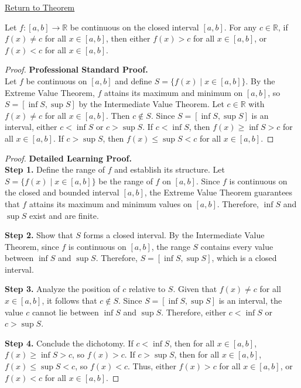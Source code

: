 \newpage
{}
\label{prf:darboux-property}

\begin{remark*}[Return]
\hyperref[thm:darboux-property]{Return to Theorem}
\end{remark*}

\begin{theorem*}
Let $f : [a, b] \to \mathbb{R}$ be continuous on the closed interval $[a, b]$. For any $c \in \mathbb{R}$, if $f(x) \neq c$ for all $x \in [a, b]$, then either $f(x) > c$ for all $x \in [a, b]$, or $f(x) < c$ for all $x \in [a, b]$.
\end{theorem*}

\begin{proof}
\textbf{Professional Standard Proof.}~\\
Let $f$ be continuous on $[a, b]$ and define $S = \{f(x) \mid x \in [a, b]\}$. By the Extreme Value Theorem, $f$ attains its maximum and minimum on $[a, b]$, so $S = [\inf S, \sup S]$ by the Intermediate Value Theorem. Let $c \in \mathbb{R}$ with $f(x) \neq c$ for all $x \in [a, b]$. Then $c \notin S$. Since $S = [\inf S, \sup S]$ is an interval, either $c < \inf S$ or $c > \sup S$. If $c < \inf S$, then $f(x) \geq \inf S > c$ for all $x \in [a, b]$. If $c > \sup S$, then $f(x) \leq \sup S < c$ for all $x \in [a, b]$.
\end{proof}

\begin{proof}
\textbf{Detailed Learning Proof.}~\\

\textbf{Step 1.} Define the range of $f$ and establish its structure. Let $S = \{f(x) \mid x \in [a, b]\}$ be the range of $f$ on $[a, b]$. Since $f$ is continuous on the closed and bounded interval $[a, b]$, the Extreme Value Theorem guarantees that $f$ attains its maximum and minimum values on $[a, b]$. Therefore, $\inf S$ and $\sup S$ exist and are finite.

\textbf{Step 2.} Show that $S$ forms a closed interval. By the Intermediate Value Theorem, since $f$ is continuous on $[a, b]$, the range $S$ contains every value between $\inf S$ and $\sup S$. Therefore, $S = [\inf S, \sup S]$, which is a closed interval.

\textbf{Step 3.} Analyze the position of $c$ relative to $S$. Given that $f(x) \neq c$ for all $x \in [a, b]$, it follows that $c \notin S$. Since $S = [\inf S, \sup S]$ is an interval, the value $c$ cannot lie between $\inf S$ and $\sup S$. Therefore, either $c < \inf S$ or $c > \sup S$.

\textbf{Step 4.} Conclude the dichotomy. If $c < \inf S$, then for all $x \in [a, b]$, $f(x) \geq \inf S > c$, so $f(x) > c$. If $c > \sup S$, then for all $x \in [a, b]$, $f(x) \leq \sup S < c$, so $f(x) < c$. Thus, either $f(x) > c$ for all $x \in [a, b]$, or $f(x) < c$ for all $x \in [a, b]$.
\end{proof}


